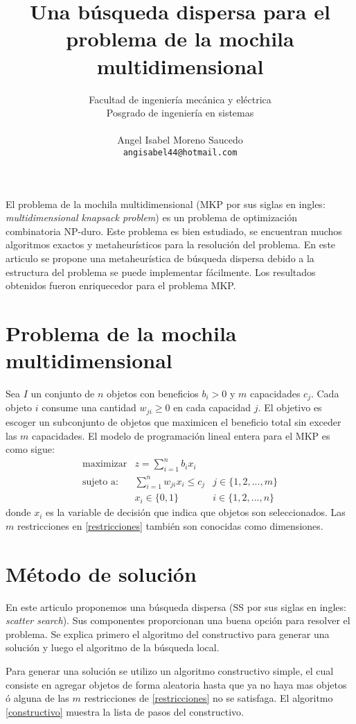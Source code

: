 \documentclass[12pt,a4paper,twocolumn]{article}
\author{Facultad de ingeniería mecánica y eléctrica \\ Posgrado de ingeniería en sistemas \\ \\ Angel Isabel Moreno Saucedo \\ \texttt{angisabel44@hotmail.com}}
\title{Una búsqueda dispersa para el problema de la mochila multidimensional}
\begin{document}
\maketitle
El problema de la mochila multidimensional (MKP por sus siglas en ingles: \emph{multidimensional knapsack problem}) es un problema de optimización combinatoria NP-duro. Este problema es bien estudiado, se encuentran muchos algoritmos exactos y metaheur\'isticos para la resolución del problema. En este articulo se propone una metaheur\'istica de búsqueda dispersa debido a la estructura del problema se puede implementar fácilmente. Los resultados obtenidos fueron enriquecedor para el problema MKP.

\section{Problema de la mochila multidimensional}
Sea $I$ un conjunto de $n$ objetos con beneficios $b_{i} > 0$ y $m$ capacidades $c_j$. Cada objeto $i$ consume una cantidad $w_{ji} \geq 0$ en cada capacidad $j$.
El objetivo es escoger un subconjunto de objetos que maximicen el beneficio total sin exceder las $m$ capacidades. El modelo de programación lineal entera para el MKP es como sigue:
\begin{align}
\text{maximizar} & z = \sum_{i = 1}^{n} b_{i}x_{i} & \label{objetivo} \\
\text{sujeto a:} & \sum_{i = 1}^{n} w_{ji}x_{i} \leq c_{j} & j \in \{1, 2,..., m\} \label{restricciones} \\
 & x_{i} \in \{0, 1\} & i \in \{1, 2,..., n\} \label{desicion}
\end{align}
donde $x_{i}$ es la variable de decisión que indica que objetos son seleccionados. Las $m$ restricciones en \ref{restricciones} también son conocidas como dimensiones.

\section{Método de solución}
En este articulo proponemos una búsqueda dispersa (SS por sus siglas en ingles: \emph{scatter search}). Sus componentes proporcionan una buena opción para resolver el problema. Se explica primero el algoritmo del constructivo para generar una solución y luego el algoritmo de la búsqueda local.

Para generar una solución se utilizo un algoritmo constructivo simple, el cual consiste en agregar objetos de forma aleatoria hasta que ya no haya mas objetos \'o alguna de las $m$ restricciones de \ref{restricciones} no se satisfaga. El algoritmo \ref{constructivo} muestra la lista de pasos del constructivo.
\end{document}

